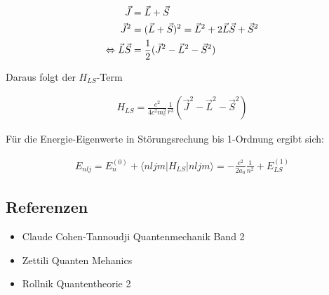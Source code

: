 \begin{align}
  \label{eq:10}
  \vec J &= \vec L + \vec S \notag \\
\vec J^2 &= (\vec L + \vec S)^2 = \vec L^2 + 2\vec L\vec S + \vec S^2\notag \\
\Leftrightarrow \vec L\vec S &= \frac{1}{2}(\vec J^2-\vec L^2-  \vec S^2)
\end{align}

Daraus folgt der \(H_{LS}\)-Term

\begin{align}
  \label{eq:11}
  H_{LS} =  \frac{e^2}{4  c^2 m_e^2}\frac{1}{r^3}(\vec J^2-\vec L^2-  \vec S^2)
\end{align}

Für die Energie-Eigenwerte in Störungsrechung bis 1-Ordnung ergibt sich:

\begin{align}
  \label{eq:12}
  E_{nlj} = E^{(0)}_n + \langle nljm|H_{LS}|nljm\rangle = -\frac{e^2}{2a_0}\frac{1}{n^2} + E_{LS}^{(1)}
\end{align}

\subsection*{Referenzen}


\begin{itemize}
\item Claude Cohen-Tannoudji Quantenmechanik Band 2
\item Zettili Quanten Mehanics
\item Rollnik Quantentheorie 2
\end{itemize}


